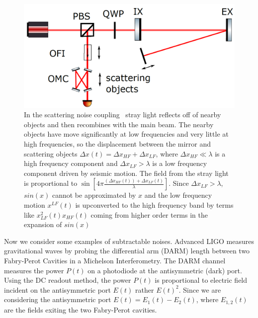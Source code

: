 \begin{refsection}
\begin{figure}[htbp]
   \centering
   \includegraphics[width=0.6\columnwidth]{chapter_noise_sub/etc/scattering}
   \caption{In the scattering noise coupling~\cite{Martynov:15} stray light reflects off of nearby objects and then recombines with the main beam. The nearby objects have move significantly at low frequencies and very little at high frequencies, so the displacement between the mirror and scattering objects $\Delta x(t) =\Delta x_{HF}+\Delta x_{LF}$, where  $\Delta x_{HF}\ll \lambda$ is a high frequency component and  $\Delta x_{LF} > \lambda$ is a low frequency component driven by seismic motion. The field from the stray light is proportional to $\sin \left[4\pi \frac{(\Delta x_{HF}(t))+\Delta x_{LF}(t)}{\lambda} \right]$. Since $\Delta x_{LF} > \lambda$, $sin(x)$ cannot be approximated by $x$ and the low frequency motion $x^{LF}(t)$ is upconverted to the high frequency band by terms like $x_{LF}^2(t)x_{HF}(t)$ coming from higher order terms in the expansion of $sin(x)$ } 
   \label{fig:scattering}
\end{figure}




Now we consider some examples of subtractable noises. Advanced LIGO measures gravitational waves by probing the differential arm (DARM) length between two Fabry-Perot Cavities in a Michelson Interferometry. The DARM channel measures the power $P(t)$ on a photodiode at the antisymmetric (dark) port. Using the DC readout method, the power $P(t)$ is proportional to electric field incident on the antisymmetric port $E(t)$ rather $E(t)^2$. Since we are considering the antisymmetric port $E(t)=E_1(t)-E_2(t)$, where $E_{1,2}(t)$ are the fields exiting the two Fabry-Perot cavities.


\end{refsection}
